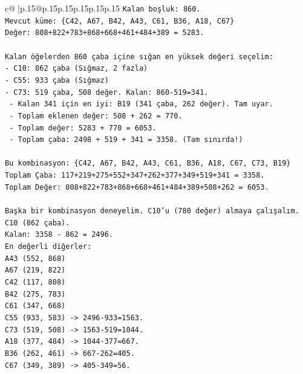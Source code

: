 \documentclass{article}
\begin{document}
{\begin{supertabular}{c@{$\;$}|p{.15\linewidth}@{}p{.15\linewidth}p{.15\linewidth}p{.15\linewidth}p{.15\linewidth}p{.15\linewidth}}
{{{\texttt{Kalan boşluk: 860.} \\
\texttt{Mevcut küme: \{C42, A67, B42, A43, C61, B36, A18, C67\}} \\
\texttt{Değer: 808+822+783+868+668+461+484+389 = 5283.} \\
\\ 
\texttt{Kalan öğelerden 860 çaba içine sığan en yüksek değeri seçelim:} \\
\texttt{{-} C10: 862 çaba (Sığmaz, 2 fazla)} \\
\texttt{{-} C55: 933 çaba (Sığmaz)} \\
\texttt{{-} C73: 519 çaba, 508 değer. Kalan: 860{-}519=341.} \\
\texttt{  {-} Kalan 341 için en iyi: B19 (341 çaba, 262 değer). Tam uyar.} \\
\texttt{  {-} Toplam eklenen değer: 508 + 262 = 770.} \\
\texttt{  {-} Toplam değer: 5283 + 770 = 6053.} \\
\texttt{  {-} Toplam çaba: 2498 + 519 + 341 = 3358. (Tam sınırda!)} \\
\\ 
\texttt{Bu kombinasyon: \{C42, A67, B42, A43, C61, B36, A18, C67, C73, B19\}} \\
\texttt{Toplam Çaba: 117+219+275+552+347+262+377+349+519+341 = 3358.} \\
\texttt{Toplam Değer: 808+822+783+868+668+461+484+389+508+262 = 6053.} \\
\\ 
\texttt{Başka bir kombinasyon deneyelim. C10'u (780 değer) almaya çalışalım.} \\
\texttt{C10 (862 çaba).} \\
\texttt{Kalan: 3358 {-} 862 = 2496.} \\
\texttt{En değerli diğerler:} \\
\texttt{A43 (552, 868)} \\
\texttt{A67 (219, 822)} \\
\texttt{C42 (117, 808)} \\
\texttt{B42 (275, 783)} \\
\texttt{C61 (347, 668)} \\
\texttt{C55 (933, 583) {-}> 2496{-}933=1563.} \\
\texttt{C73 (519, 508) {-}> 1563{-}519=1044.} \\
\texttt{A18 (377, 484) {-}> 1044{-}377=667.} \\
\texttt{B36 (262, 461) {-}> 667{-}262=405.} \\
\texttt{C67 (349, 389) {-}> 405{-}349=56.} \\
}}}
\end{supertabular}}
\end{document}
